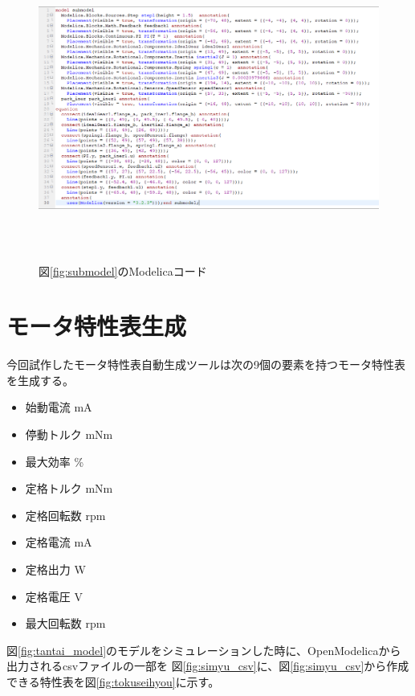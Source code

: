   \begin{figure}[t]
	\centering
	\includegraphics[width=16.5cm,height=10cm]{./Image/sub_modelica.png}
	\caption{図\ref{fig:submodel}のModelicaコード}
	\label{fig:sub_modelica}
  \end{figure}

  \clearpage

  \section{モータ特性表生成}\label{kenkyu_mokuteki}
今回試作したモータ特性表自動生成ツールは次の9個の要素を持つモータ特性表を生成する。

\begin{itemize}
	\item 始動電流 mA
	\item 停動トルク mNm
	\item 最大効率 \%
	\item 定格トルク mNm 
	\item 定格回転数 rpm
	\item 定格電流 mA
	\item 定格出力 W
	\item 定格電圧 V
	\item 最大回転数 rpm 
\end{itemize}

図\ref{fig:tantai_model}のモデルをシミュレーションした時に、OpenModelicaから出力されるcsvファイルの一部を
図\ref{fig:simyu_csv}に、図\ref{fig:simyu_csv}から作成できる特性表を図\ref{fig:tokuseihyou}に示す。

